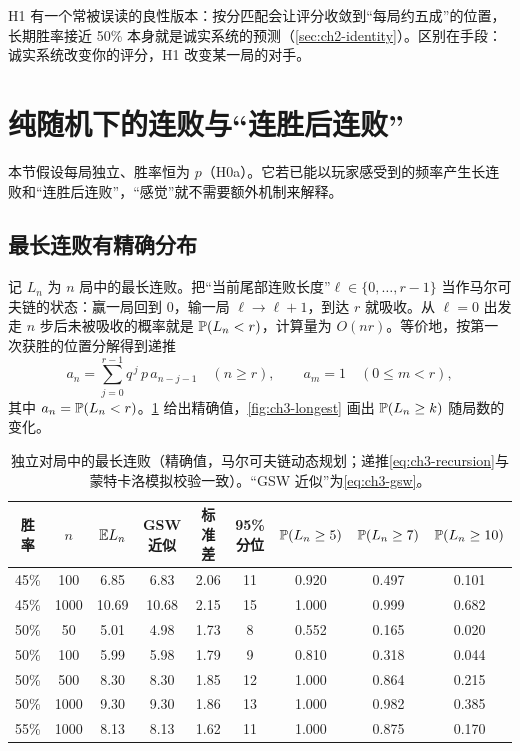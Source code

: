 H1 有一个常被误读的良性版本：按分匹配会让评分收敛到“每局约五成”的位置，长期胜率接近 50\% 本身就是诚实系统的预测（\cref{sec:ch2-identity}）。区别在手段：诚实系统改变你的评分，H1 改变某一局的对手。

\section{纯随机下的连败与“连胜后连败”}
\label{sec:ch3-random}

本节假设每局独立、胜率恒为 $p$（H0a）。它若已能以玩家感受到的频率产生长连败和“连胜后连败”，“感觉”就不需要额外机制来解释。

\subsection{最长连败有精确分布}
\label{sec:ch3-longest}

记 $L_n$ 为 $n$ 局中的最长连败。把“当前尾部连败长度”$\ell\in\{0,\dots,r-1\}$ 当作马尔可夫链的状态：赢一局回到 0，输一局 $\ell\to\ell+1$，到达 $r$ 就吸收。从 $\ell=0$ 出发走 $n$ 步后未被吸收的概率就是 $\mathbb{P}(L_n<r)$，计算量为 $O(nr)$。等价地，按第一次获胜的位置分解得到递推
\begin{equation}
a_n=\sum_{j=0}^{r-1}q^{\,j}\,p\,a_{n-j-1}\quad(n\ge r),\qquad a_m=1\quad(0\le m<r),
\label{eq:ch3-recursion}
\end{equation}
其中 $a_n=\mathbb{P}(L_n<r)$。\cref{tab:ch3-longest} 给出精确值，\cref{fig:ch3-longest} 画出 $\mathbb{P}(L_n\ge k)$ 随局数的变化\tagOwn{}。

\begin{table}[htbp]
\centering\small
\caption{独立对局中的最长连败（精确值，马尔可夫链动态规划；递推\cref{eq:ch3-recursion}与蒙特卡洛模拟校验一致）。“GSW 近似”为\cref{eq:ch3-gsw}。}
\label{tab:ch3-longest}
\setlength{\tabcolsep}{4pt}
\begin{tabular}{ccccccccc}
\toprule
胜率 & $n$ & $\mathbb{E} L_n$ & GSW 近似 & 标准差 & 95\% 分位 & $\mathbb{P}(L_n\ge5)$ & $\mathbb{P}(L_n\ge7)$ & $\mathbb{P}(L_n\ge10)$ \\
\midrule
45\% & 100 & 6.85 & 6.83 & 2.06 & 11 & 0.920 & 0.497 & 0.101 \\
45\% & 1000 & 10.69 & 10.68 & 2.15 & 15 & 1.000 & 0.999 & 0.682 \\
50\% & 50 & 5.01 & 4.98 & 1.73 & 8 & 0.552 & 0.165 & 0.020 \\
50\% & 100 & 5.99 & 5.98 & 1.79 & 9 & 0.810 & 0.318 & 0.044 \\
50\% & 500 & 8.30 & 8.30 & 1.85 & 12 & 1.000 & 0.864 & 0.215 \\
50\% & 1000 & 9.30 & 9.30 & 1.86 & 13 & 1.000 & 0.982 & 0.385 \\
55\% & 1000 & 8.13 & 8.13 & 1.62 & 11 & 1.000 & 0.875 & 0.170 \\
\bottomrule
\end{tabular}
\end{table}

